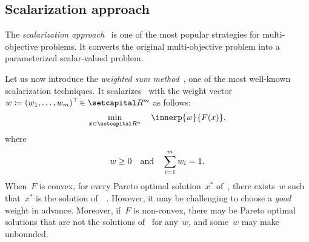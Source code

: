 \documentclass[../../main]{subfiles}
\begin{document}
\subsection{Scalarization approach}
The \emph{scalarization approach}~\cite{Gass1955,Geoffrion1968,Zadeh1963} is one of the most popular strategies for multi-objective problems.
It converts the original multi-objective problem into a parameterized scalar-valued problem.

Let us now introduce the \emph{weighted sum method}~\cite{Zadeh1963}, one of the most well-known scalarization techniques.
It scalarizes~ with the weight vector~$w \coloneqq (w_1, \dots, w_m)^\T \in \setR^m$ as follows:
\begin{equation} \label{eq:weighted}
    \min_{x \in \setR^n} \quad \innerp{w}{F(x)}
    ,\end{equation}
where
\begin{equation}
    w \ge 0 \quad \text{and} \quad \sum_{i = 1}^{m} w_i = 1
    .\end{equation}
When~$F$ is convex, for every Pareto optimal solution~$x^\ast$ of~, there exists~$w$ such that~$x^\ast$ is the solution of~~\cite{Miettinen1998}.
However, it may be challenging to choose a \emph{good} weight in advance.
Moreover, if~$F$ is non-convex, there may be Pareto optimal solutions that are not the solutions of~ for any~$w$, and some~$w$ may make~ unbounded.
\end{document}
